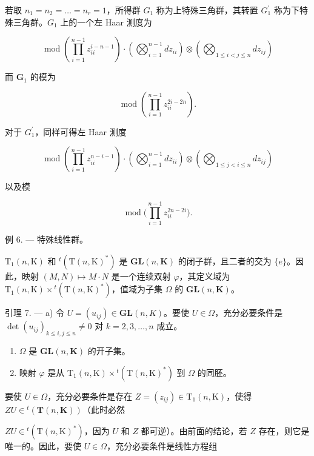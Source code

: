 若取 \(n_{1}=n_{2}=\ldots=n_{r}=1\)，所得群 \(G_{1}\) 称为上特殊三角群，其转置 \(G_{1}^{\prime}\) 称为下特殊三角群。\(G_{1}\) 上的一个左 Haar 测度为

\[
\operatorname{mod} \left(\prod_ {i = 1} ^ {n - 1} z _ {i i} ^ {i - n - 1}\right) \cdot \left(\bigotimes_ {i = 1} ^ {n - 1} d z _ {i i}\right) \otimes \left(\bigotimes_ {1 \leqslant i <   j \leqslant n} d z _ {i j}\right)\tag{11}
\]

而 \(\mathbf{G}_1\) 的模为

\[
\operatorname{mod} \left(\prod_ {i = 1} ^ {n - 1} z _ {i i} ^ {2 i - 2 n}\right).\tag{12}
\]

对于 \(G_{1}^{\prime}\)，同样可得左 Haar 测度

\[
\operatorname{mod} \left(\prod_ {i = 1} ^ {n - 1} z _ {i i} ^ {n - i - 1}\right) \cdot \left(\bigotimes_ {i = 1} ^ {n - 1} d z _ {i i}\right) \otimes \left(\bigotimes_ {1 \leqslant j <   i \leqslant n} d z _ {i j}\right)
\]

以及模

\[
\operatorname{mod} \biggl (\prod_ {i = 1} ^ {n - 1} z _ {i i} ^ {2 n - 2 i} \biggr).
\]

例 6. --- 特殊线性群。

\(\mathrm{T}_{1}(n,\mathrm{K})\) 和 \({}^{t}(\mathrm{T}(n,\mathrm{K})^{*})\) 是 \(\mathbf{GL}(n,\mathbf{K})\) 的闭子群，且二者的交为 \(\{e\}\)。因此，映射 \((M,N)\mapsto M\cdot N\) 是一个连续双射 \(\varphi\)，其定义域为 \(\mathrm{T}_{1}(n,\mathrm{K})\times{}^{t}(\mathrm{T}(n,\mathrm{K})^{*})\)，值域为子集 \(\Omega\) 的 \(\mathbf{GL}(n,\mathbf{K})\)。

引理 7. --- a) 令 \(U = (u_{ij}) \in \mathbf{GL}(n, K)\)。要使 \(U \in \Omega\)，充分必要条件是 \(\det(u_{ij})_{k \leqslant i,j \leqslant n} \neq 0\) 对 \(k = 2, 3, \ldots, n\) 成立。

\begin{enumerate}
\def\labelenumi{\alph{enumi})}
\setcounter{enumi}{1}
\item
  \(\Omega\) 是 \(\mathbf{GL}(n,\mathbf{K})\) 的开子集。
\item
  映射 \(\varphi\) 是从 \(\mathrm{T}_1(n,\mathrm{K})\times {}^t (\mathrm{T}(n,\mathrm{K})^*)\) 到 \(\Omega\) 的同胚。
\end{enumerate}

要使 \(U \in \Omega\)，充分必要条件是存在 \(Z = (z_{ij}) \in \mathrm{T}_1(n,\mathrm{K})\)，使得 \(ZU \in {}^t (\mathbf{T}(n,\mathbf{K}))\)（此时必然

\(ZU \in {}^{t}(\mathrm{T}(n,\mathrm{K})^{*})\)，因为 \(U\) 和 \(Z\) 都可逆）。由前面的结论，若 \(Z\) 存在，则它是唯一的。因此，要使 \(U \in \Omega\)，充分必要条件是线性方程组

